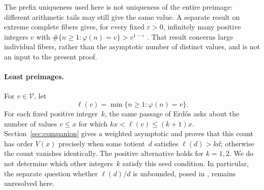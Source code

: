 The prefix uniqueness used here is not uniqueness of the entire preimage:
different arithmetic tails may still give the same value. A separate
result on extreme complete fibers gives, for every fixed $\varepsilon>0$,
infinitely many positive integers $v$ with
$\#\{n\ge1:\varphi(n)=v\}>v^{1-\varepsilon}$
\cite[Theorem~1.1]{OpenAITotientFibers2026}. That result concerns
large individual fibers, rather than the asymptotic number of distinct
values, and is not an input to the present proof.

\paragraph{Least preimages.}
For $v\in\mathcal V$, let
\[
 \ell(v)=\min\{n\ge1:\varphi(n)=v\}.
\]
For each fixed positive integer~$k$, the same passage of Erd\H{o}s
\cite[p.~80]{Erdos1979} asks about the number of values $v\le x$ for
which $kx<\ell(v)\le(k+1)x$. Section~\ref{sec:companion} gives a
weighted asymptotic and proves that this count has order $V(x)$
precisely when some totient~$d$ satisfies $\ell(d)>kd$; otherwise
the count vanishes identically. The positive alternative holds for
$k=1,2$. We do not determine which other integers~$k$ satisfy this
seed condition. In particular, the separate question whether
$\ell(d)/d$ is unbounded, posed in \cite[Section~I.9]{Erdos1995},
remains unresolved here.
